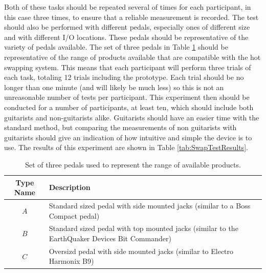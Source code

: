 \documentclass{article}
\begin{document}
	Both of these tasks should be repeated several of times for each participant, in this case three times, to ensure that a reliable measurement is recorded.  The test should also be performed with different pedals, especially ones of different size and with different I/O locations.  These pedals should be representative of the variety of pedals available.  The set of three pedals in Table \ref{tab:SwapTestPedals} should be representative of the range of products available that are compatible with the hot swapping system.  This means that each participant will perform three trials of each task, totaling 12 trials including the prototype.  Each trial should be no longer than one minute (and will likely be much less) so this is not an unreasonable number of tests per participant.  This experiment then should be conducted for a number of participants, at least ten, which should include both guitarists and non-guitarists alike.  Guitarists should have an easier time with the standard method, but comparing the measurements of non guitarists with guitarists should give an indication of how intuitive and simple the device is to use.  The results of this experiment are shown in Table \ref{tab:SwapTestResults}.



	\begin{table}
	\begin{center}
	\begin{tabular}{ |c|p{8cm}| }
	\hline
	 Type Name & Description \\ 
	 \hline
	 $A$ & Standard sized pedal with side mounted jacks (similar to a Boss Compact pedal) \\
	 $B$ & Standard sized pedal with top mounted jacks (similar to the EarthQuaker Devices Bit Commander) \\
	 $C$ & Oversizd pedal with side mounted jacks (similar to Electro Harmonix B9) \\
	 \hline
	\end{tabular}
	\caption{Set of three pedals used to represent the range of available products.}
	\label{tab:SwapTestPedals} 
	\end{center}
	\end{table}
\end{document}
